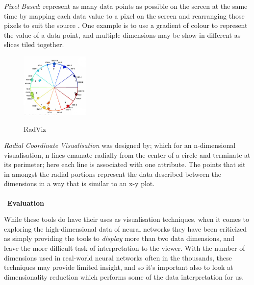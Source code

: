 \documentclass[a4paper,11pt,titlepage]{article}
\begin{document}
		\textit{Pixel Based}; represent as many data points as possible on the screen at the same time by mapping each data value to a pixel on the screen and rearranging those pixels to suit the source \cite{Keim2000}. One example is to use a gradient of colour to represent the value of a data-point, and multiple dimensions may be show in different as slices tiled together.
		\par 
		 		
	\begin{figure}[H]
    			\centering	
			{{\includegraphics[width=0.3\textwidth]
    				{img/battista_vertices} 
    			}}%
    			\caption{RadViz}%
    		\label{fig:lascaux}
	\end{figure}	 		
 		
 		
		\textit{Radial Coordinate Visualisation} was designed by\cite{Hoffman1999}; which for an n-dimensional visualisation, n lines emanate radially from the center of a circle and terminate at its perimeter; here each line is associated with one attribute. The points that sit in amongst the radial portions represent the data described between the dimensions in a way that is similar to an x-y plot.
		\\\
		\\\
	\textbf{Evaluation}
	\par 
	While these tools do have their uses as visualisation techniques, when it comes to exploring the high-dimensional data of neural networks they have been criticized \cite{Maaten2008} as simply providing the tools to \textit{display} more than two data dimensions, and leave the more difficult task of interpretation to the viewer. With the number of dimensions used in real-world neural networks often in the thousands, these techniques may provide limited insight, and so it's important also to look at dimensionality reduction which performs some of the data interpretation for us.
\\\
\end{document}
